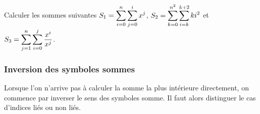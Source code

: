 \documentclass[a4paper, 11pt,reqno]{article}
\begin{document}
\begin{minipage}[t]{0.6\textwidth}
\setlength\fboxrule{1pt}
\end{minipage}



{\footnotesize 
\begin{exercice} 
Calculer les sommes suivantes $S_1= \displaystyle \sum\limits_{i=0}^n \sum\limits_{j=0}^i x^j$, $S_2=\displaystyle \sum\limits_{k=0}^{n^2}\sum\limits_{i=k}^{k+2} ki^2$ et $S_3=\displaystyle\sum\limits_{j=1}^n\sum\limits_{i=0}^j \displaystyle\frac{x^i}{x^{j}}$.
\end{exercice}}


\subsubsection{Inversion des symboles sommes}

\noindent Lorsque l'on n'arrive pas \`{a} calculer la somme la plus int\'erieure directement, on commence par inverser le sens des symboles somme. Il faut alors distinguer le cas d'indices li\'es ou non li\'es.
\end{document}
